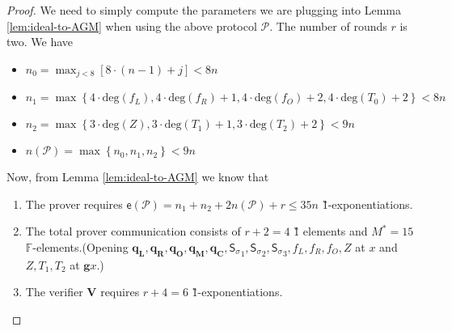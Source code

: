 \documentclass[11pt]{article} %
\newcommand{\F}{\ensuremath{\mathbb F}\xspace}
\newcommand{\proverexp}{\ensuremath{\mathsf{e}}\xspace}
\renewcommand{\deg}{\ensuremath{\mathrm{deg}}\xspace}
\newcommand{\defeq}{:=}
\newcommand{\ver}{\ensuremath{\mathsf{\mathbf{V}}}\xspace}
\newcommand{\set}[1]{\ensuremath{\left\{#1\right\}}\xspace}
\newcommand{\hgen}{\ensuremath{\mathbf{g}}\xspace}
\newcommand{\prot}{\ensuremath{\mathscr{P}}\xspace}
\newcommand{\sigpoly}{\ensuremath{\mathsf{S_{\sigma}}}\xspace}
\newcommand{\selleft}{\ensuremath{\mathbf{q_L}}\xspace}
\newcommand{\selright}{\ensuremath{\mathbf{q_R}}\xspace}
\newcommand{\selout}{\ensuremath{\mathbf{q_O}}\xspace}
\newcommand{\selmult}{\ensuremath{\mathbf{q_M}}\xspace}
\newcommand{\selconst}{\ensuremath{\mathbf{q_C}}\xspace}
\newcommand{\lt}[1]{\ensuremath{ [ {\scriptscriptstyle <} #1]}\xspace}
\newcommand{\f}{\ensuremath{\bar{f}}\xspace}
\begin{document}
\begin{proof}
 We need to simply compute the parameters we are plugging into Lemma \ref{lem:ideal-to-AGM} when using the above protocol \prot.
 The number of rounds $r$ is two.
 We have
 \begin{itemize}
  \item 

 $n_0=\max_{j<8} \left[8\cdot (n-1)+j\right] <8n$
\item  $n_1=\max \set{4\cdot \deg(f_L),4\cdot \deg(f_R)+1,4\cdot \deg(f_O)+2,4\cdot \deg(T_0)+2} <8n$
\item $n_2 = \max \set{3\cdot \deg(Z),3\cdot \deg(T_1)+1, 3\cdot \deg(T_2)+2} <9n$
\item $n(\prot) = \max\set{n_0,n_1,n_2}<9n$
 \end{itemize}
 Now, from Lemma \ref{lem:ideal-to-AGM} we know that 
 \begin{enumerate}
  \item The prover requires $\proverexp(\prot)=n_1+n_2+2n(\prot)+r\leq 35n$ \G1-exponentiations.
  \item The total prover communication consists of $r+2=4$ \G1 elements and $M^*=15$ \F-elements.(Opening $\selleft,\selright,\selout,\selmult,\selconst,\sigpoly_1,\sigpoly_2,\sigpoly_3,f_L,f_R,f_O,Z$ at $x$ and $Z,T_1,T_2$ at $\hgen x$.) 
\item The verifier \ver requires $r+4=6$ \G1-exponentiations.
 \end{enumerate}

 
% 
\end{proof}
\end{document}
